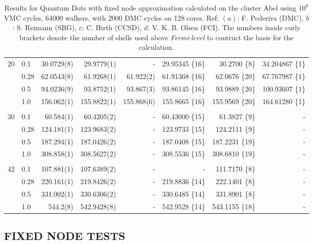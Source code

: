 \begin{table}
\begin{center}
\begin{tabular}{rl|rrrrrr}
    20    &   0.1    &  30.0729(8)  &  29.9779(1) & -		&29.95345 \{16\}	& 30.2700 \{8\} & 34.204867 \{1\}\\
          &   0.28   &  62.0543(8)  &  61.9268(1) & 61.922(2) &61.91368 \{16\}	& 62.0676 \{20\} & 67.767987 \{1\}\\
          &   0.5    &  94.0236(9)  &  93.8752(1) & 93.867(3) &93.86145 \{16\}	& 93.9889 \{20\} & 100.93607 \{1\}\\
          &   1.0    & 156.062(1)   & 155.8822(1) & 155.868(6)&155.8665 \{16\}	& 155.9569 \{20\}& 164.61280 \{1\}\\
\cline{2-8}
\multicolumn{8}{c}{} \\
    30    &   0.1    &  60.584(1)  &  60.4205(2)  & -		&60.43000 \{15\}	&  61.3827 \{9\}& -\\
          &   0.28   & 124.181(1)  & 123.9683(2)  & - 		&123.9733 \{15\}	& 124.2111 \{9\}& -\\
          &   0.5    & 187.294(1)  & 187.0426(2)  & - 		&187.0408 \{15\}	& 187.2231 \{19\}& -\\
          &   1.0    & 308.858(1)  & 308.5627(2)  & -	 	&308.5536 \{15\}	& 308.6810 \{19\}& -\\
\cline{2-8}
\multicolumn{8}{c}{} \\
    42    &   0.1    & 107.881(1)  & 107.6389(2)  & - 		&- 			& 111.7170 \{8\}& -\\
          &   0.28   & 220.161(1)  & 219.8426(2)  & - 		&219.8836 \{14\}	& 222.1401 \{8\}& -\\
          &   0.5    & 331.002(1)  & 330.6306(2)  & - 		&330.6485 \{14\}	& 331.8901 \{8\}& -\\
          &   1.0    & 544.2(8)    & 542.9428(8)  & - 		&542.9528 \{14\}	& 543.1155 \{18\}& -\\
\hline\hline


\end{tabular}
\caption{Results for Quantum Dots with fixed node approximation calculated on the cluster Abel using $10^8$ VMC cycles, $64000$ walkers, with $2000$ DMC cycles on 128 cores. Ref: $(a)$: F. Pederiva \cite{MagnusArticle} (DMC), $b$: S. Reimann \cite{Sarah} (SRG), $c$: C. Hirth \cite{Hirth} (CCSD), $d$: V. K. B. Olsen \cite{Olsen} (FCI). The numbers inside curly brackets denote the number of shells used above \textit{Fermi-level} to contruct the basis for the calculation.}
\label{tab:QDotsResultsAll}
\end{center}
\end{table}

\subsection{FIXED NODE TESTS}


